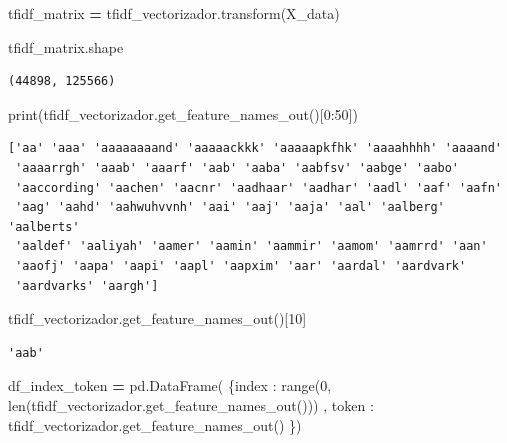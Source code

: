 \documentclass[
  11pt,
  a4paper,
]{article}
\newenvironment{Shaded}{\begin{snugshade}}{\end{snugshade}}
\newcommand{\BuiltInTok}[1]{#1}
\newcommand{\DecValTok}[1]{\textcolor[rgb]{0.00,0.00,0.81}{#1}}
\newcommand{\NormalTok}[1]{#1}
\newcommand{\OperatorTok}[1]{\textcolor[rgb]{0.81,0.36,0.00}{\textbf{#1}}}
\newcommand{\StringTok}[1]{\textcolor[rgb]{0.31,0.60,0.02}{#1}}
\begin{document}
\begin{Shaded}
\begin{Highlighting}[]
\NormalTok{tfidf\_matrix }\OperatorTok{=}\NormalTok{ tfidf\_vectorizador.transform(X\_data)}
\end{Highlighting}
\end{Shaded}

\begin{Shaded}
\begin{Highlighting}[]
\NormalTok{tfidf\_matrix.shape}
\end{Highlighting}
\end{Shaded}

\begin{verbatim}
(44898, 125566)
\end{verbatim}

\begin{Shaded}
\begin{Highlighting}[]
\BuiltInTok{print}\NormalTok{(tfidf\_vectorizador.get\_feature\_names\_out()[}\DecValTok{0}\NormalTok{:}\DecValTok{50}\NormalTok{])}
\end{Highlighting}
\end{Shaded}

\begin{verbatim}
['aa' 'aaa' 'aaaaaaaand' 'aaaaackkk' 'aaaaapkfhk' 'aaaahhhh' 'aaaand'
 'aaaarrgh' 'aaab' 'aaarf' 'aab' 'aaba' 'aabfsv' 'aabge' 'aabo'
 'aaccording' 'aachen' 'aacnr' 'aadhaar' 'aadhar' 'aadl' 'aaf' 'aafn'
 'aag' 'aahd' 'aahwuhvvnh' 'aai' 'aaj' 'aaja' 'aal' 'aalberg' 'aalberts'
 'aaldef' 'aaliyah' 'aamer' 'aamin' 'aammir' 'aamom' 'aamrrd' 'aan'
 'aaofj' 'aapa' 'aapi' 'aapl' 'aapxim' 'aar' 'aardal' 'aardvark'
 'aardvarks' 'aargh']
\end{verbatim}

\begin{Shaded}
\begin{Highlighting}[]
\NormalTok{tfidf\_vectorizador.get\_feature\_names\_out()[}\DecValTok{10}\NormalTok{]}
\end{Highlighting}
\end{Shaded}

\begin{verbatim}
'aab'
\end{verbatim}

\begin{Shaded}
\begin{Highlighting}[]
\NormalTok{df\_index\_token }\OperatorTok{=}\NormalTok{ pd.DataFrame( \{}\StringTok{\textquotesingle{}index\textquotesingle{}}\NormalTok{ : }\BuiltInTok{range}\NormalTok{(}\DecValTok{0}\NormalTok{, }\BuiltInTok{len}\NormalTok{(tfidf\_vectorizador.get\_feature\_names\_out())) , }\StringTok{\textquotesingle{}token\textquotesingle{}}\NormalTok{ : tfidf\_vectorizador.get\_feature\_names\_out() \})}
\end{Highlighting}
\end{Shaded}
\end{document}
